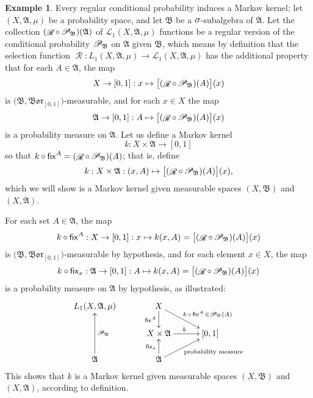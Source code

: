 \documentclass[
twoside=true,
paper=letter,
fontsize=9pt,
pagesize=auto,
leqno,
openany,
headsepline,
overfullrule,
]{scrbook}
\theoremstyle{plain}
\theoremstyle{plain}
\theoremstyle{definition}
\newtheorem{example}[thm]{Example}
\theoremstyle{bfnoteitalic}
\theoremstyle{bfnoteroman}
\newcommand{\sigalg}[1]{\mathfrak{#1}}
\newcommand{\cali}[1]{\mathscr{#1}}
\newcommand{\sfop}[1]{\mathsf{#1}}
\newcommand{\condprobop}[1]{\mathop{\cali{P}\hspace{-1pt}}\nolimits_{#1}}
\newcommand{\borel}{\mathfrak{Bor}}
\newcommand{\textsigma}{\hbox{\large{$\sigma$}}\kern-1pt}
\newcommand{\sigmaalgebra}{\sigalg{A}}
\newcommand{\sigmaalgebraii}{\sigalg{B}}
\newcommand{\Lone}{L_1(\measurespace, \sigmaalgebra, \measure)}
\newcommand{\caliLone}{\cali{L}_1(\measurespace, \sigmaalgebra, \measure)}
\newcommand{\measurespace}{X}
\newcommand{\mspaceelt}{x}
\newcommand{\measure}{\mu}
\newcommand{\seti}{A}
\newcommand{\regular}{\mathop{\cali{R}}}
\newcommand{\markovkernel}{k}
\newcommand{\fixinthefirst}[1]{\sfop{fix}_{#1}}
\newcommand{\fixinthesecond}[1]{\sfop{fix}^{#1}}
\begin{document}
\begin{example}\label{regular_conditional_probability_induces_markov_kernel}
Every regular conditional probability induces a Markov kernel;
let $(\measurespace,\sigmaalgebra,\measure)$ be a probability space, and let $\sigmaalgebraii$ be a $\textsigma$-subalgebra of $\sigmaalgebra$.
Let the collection 
$(\regular\circ\condprobop{\sigmaalgebraii})(\sigmaalgebra)$ 
of 
$\caliLone$ functions
be a regular version of the conditional probability $\condprobop{\sigmaalgebraii}$ on $\sigmaalgebra$ given $\sigmaalgebraii$, which means by definition that the selection function 
$\regular:\Lone\to\caliLone$
has the additional property that for each $\seti\in\sigmaalgebra$, the map 
\[
\measurespace\to [0,1] : \mspaceelt\mapsto
\bigl[ (\regular\circ\condprobop{\sigmaalgebraii}) (\seti)\bigr](\mspaceelt)
\]
is $\bigl(\sigmaalgebraii, \borel_{[0,1]}\bigr)$\hyp{}measurable, and for each 
$\mspaceelt\in\measurespace$ the map
\[
\sigmaalgebra\to [0,1]: \seti \mapsto 
\bigl[ (\regular\circ\condprobop{\sigmaalgebraii}) (\seti)\bigr](\mspaceelt)
\]
is a probability measure on $\sigmaalgebra$.
Let us define a Markov kernel
\[
\markovkernel : \measurespace\times\sigmaalgebra \to [0,1]
\]
so that
$\markovkernel \circ\fixinthesecond{\seti}
=
(\regular\circ\condprobop{\sigmaalgebraii}) (\seti)$;
that is, define
\[
\markovkernel : \measurespace\times\sigmaalgebra
: (\mspaceelt,\seti)\mapsto  
\bigl[ (\regular\circ\condprobop{\sigmaalgebraii}) (\seti)\bigr](\mspaceelt),
\]
which we will show is a Markov kernel given measurable spaces $(\measurespace,\sigmaalgebraii)$ and $(\measurespace, \sigmaalgebra)$.

For each set $\seti\in\sigmaalgebra$, the map
\[
\markovkernel\circ\fixinthesecond{\seti}
: \measurespace\to [0,1]
: \mspaceelt\mapsto \markovkernel(\mspaceelt, \seti)
= 
\bigl[ (\regular\circ\condprobop{\sigmaalgebraii}) (\seti)\bigr](\mspaceelt)
\]
is  $\bigl(\sigmaalgebraii, \borel_{[0,1]}\bigr)$\hyp{}measurable by hypothesis, and for each element $\mspaceelt\in\measurespace$, the map
\[
\markovkernel\circ\fixinthefirst{\mspaceelt}
: \sigmaalgebra\to [0,1]
: \seti\mapsto
\markovkernel(\mspaceelt, \seti)
=
\bigl[ (\regular\circ\condprobop{\sigmaalgebraii}) (\seti)\bigr](\mspaceelt)
\]
is a probability measure on
$\sigmaalgebra$ by hypothesis, as illustrated:
\[
\xymatrix@R=16pt@C=30pt{ 
\Lone &
\measurespace \ar[d]_-{\fixinthesecond{\seti}} 
\ar[dr]^{\ \quad\markovkernel\,\circ\,\fixinthesecond{\seti}\,
\in
\condprobop{\sigmaalgebraii}(\seti)}
\\
&\measurespace\times\sigmaalgebra \ar[r]^{\markovkernel} & [0,1] 
\\
\sigmaalgebra \ar[uu]_{\condprobop{\sigmaalgebraii}} & \sigmaalgebra
\ar[ur]_{\qquad\text{probability measure}} \ar[u]^{\fixinthefirst{\mspaceelt}} & 
\\
}
\]
This shows that $\markovkernel$ is a Markov kernel given measurable spaces $(\measurespace,\sigmaalgebraii)$ and $(\measurespace, \sigmaalgebra)$, according to definition. 
\end{example}
\end{document}
